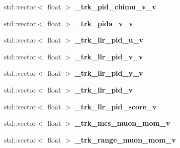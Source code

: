 \begin{DoxyCompactItemize}
\item 
std\+::vector$<$ float $>$ {\bfseries \+\_\+trk\+\_\+pid\+\_\+chimu\+\_\+v\+\_\+v}\hypertarget{classanalysis_1_1TrackAnalysis_a2efb1d1f7ac135d1f0cd5550c34779c2}{}\label{classanalysis_1_1TrackAnalysis_a2efb1d1f7ac135d1f0cd5550c34779c2}

\item 
std\+::vector$<$ float $>$ {\bfseries \+\_\+trk\+\_\+pida\+\_\+v\+\_\+v}\hypertarget{classanalysis_1_1TrackAnalysis_a6dcd84b8b676b91767dc0336a548fde6}{}\label{classanalysis_1_1TrackAnalysis_a6dcd84b8b676b91767dc0336a548fde6}

\item 
std\+::vector$<$ float $>$ {\bfseries \+\_\+trk\+\_\+llr\+\_\+pid\+\_\+u\+\_\+v}\hypertarget{classanalysis_1_1TrackAnalysis_a3b3d63fdb1de1ce40e72e2f54d5aa3be}{}\label{classanalysis_1_1TrackAnalysis_a3b3d63fdb1de1ce40e72e2f54d5aa3be}

\item 
std\+::vector$<$ float $>$ {\bfseries \+\_\+trk\+\_\+llr\+\_\+pid\+\_\+v\+\_\+v}\hypertarget{classanalysis_1_1TrackAnalysis_aed8218478edadddb4d6503686c16448a}{}\label{classanalysis_1_1TrackAnalysis_aed8218478edadddb4d6503686c16448a}

\item 
std\+::vector$<$ float $>$ {\bfseries \+\_\+trk\+\_\+llr\+\_\+pid\+\_\+y\+\_\+v}\hypertarget{classanalysis_1_1TrackAnalysis_a725c93a33d3da91b525b9b1c9d0aad95}{}\label{classanalysis_1_1TrackAnalysis_a725c93a33d3da91b525b9b1c9d0aad95}

\item 
std\+::vector$<$ float $>$ {\bfseries \+\_\+trk\+\_\+llr\+\_\+pid\+\_\+v}\hypertarget{classanalysis_1_1TrackAnalysis_a15121d48891dfed8fbcd02b97875a845}{}\label{classanalysis_1_1TrackAnalysis_a15121d48891dfed8fbcd02b97875a845}

\item 
std\+::vector$<$ float $>$ {\bfseries \+\_\+trk\+\_\+llr\+\_\+pid\+\_\+score\+\_\+v}\hypertarget{classanalysis_1_1TrackAnalysis_a8747290da87b94faec836c472dea9822}{}\label{classanalysis_1_1TrackAnalysis_a8747290da87b94faec836c472dea9822}

\item 
std\+::vector$<$ float $>$ {\bfseries \+\_\+trk\+\_\+mcs\+\_\+muon\+\_\+mom\+\_\+v}\hypertarget{classanalysis_1_1TrackAnalysis_a8c72ab8bf9729ad741b1fcdb1b8916b3}{}\label{classanalysis_1_1TrackAnalysis_a8c72ab8bf9729ad741b1fcdb1b8916b3}

\item 
std\+::vector$<$ float $>$ {\bfseries \+\_\+trk\+\_\+range\+\_\+muon\+\_\+mom\+\_\+v}\hypertarget{classanalysis_1_1TrackAnalysis_a99b7d6a37b1db9ed9875106d7981da17}{}\label{classanalysis_1_1TrackAnalysis_a99b7d6a37b1db9ed9875106d7981da17}


\end{DoxyCompactItemize}
